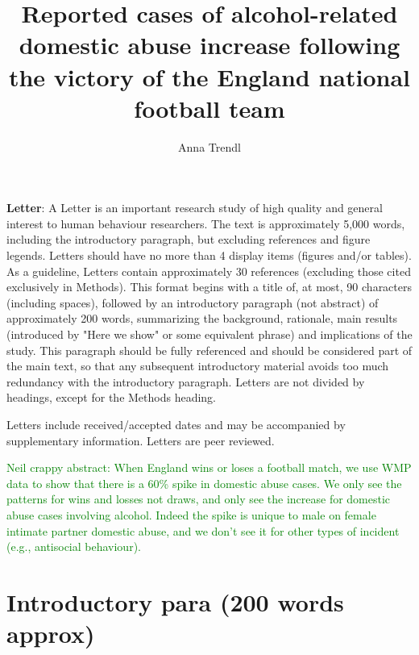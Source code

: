 \documentclass[12pt, letterpaper]{article}
\newcommand{\NS}[1] {{\textcolor{green}{#1}}}
\begin{document}
\title{Reported cases of alcohol-related domestic abuse increase following the victory of the England national football team}


\author{Anna Trendl}
\textbf{Letter}:
A Letter is an important research study of high quality and general interest to human behaviour researchers.  The text is approximately 5,000 words, including the introductory paragraph, but excluding references and figure legends. Letters should have no more than 4 display items (figures and/or tables). As a guideline, Letters contain approximately 30 references (excluding those cited exclusively in Methods). This format begins with a title of, at most, 90 characters (including spaces), followed by an introductory paragraph (not abstract) of approximately 200 words, summarizing the background, rationale, main results (introduced by "Here we show" or some equivalent phrase) and implications of the study. This paragraph should be fully referenced and should be considered part of the main text, so that any subsequent introductory material avoids too much redundancy with the introductory paragraph. Letters are not divided by headings, except for the Methods heading.

Letters include received/accepted dates and may be accompanied by supplementary information. Letters are peer reviewed.


\maketitle

\NS{Neil crappy abstract: When England wins or loses a football match, we use WMP data to show that there is a 60\% spike in domestic abuse cases.  We only see the patterns for wins and losses not draws, and only see the increase for domestic abuse cases involving alcohol. Indeed the spike is unique to male on female intimate partner domestic abuse, and we don't see it for other types of incident (e.g., antisocial behaviour).}

\section{Introductory para (200 words approx)}
\end{document}
